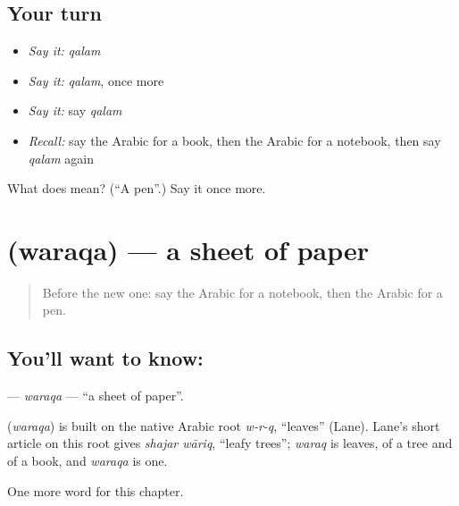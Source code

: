 \subsection*{Your turn}
\begin{itemize}
\raggedright
  \item \emph{Say it:} \emph{qalam}
  \item \emph{Say it:} \emph{qalam}, once more
  \item \emph{Say it:} say \emph{qalam}
  \item \emph{Recall:} say the Arabic for a book, then the Arabic for a notebook, then say \emph{qalam} again
\end{itemize}

\begin{tcolorbox}[breakable,colback=teal!4,colframe=teal!35!black,title={Before you move on}]
What does  mean? (\textquotedblleft{}A pen\textquotedblright{}.) Say it once more.
\end{tcolorbox}
\section[\texorpdfstring{\ar{ورقة} (waraqa)}{ورقة (waraqa)}]{ (waraqa) — a sheet of paper}

\label{lesson:AR-C73-waraqa}



\begin{quote}
Before the new one: say the Arabic for a notebook, then the Arabic for a pen.
\end{quote}

\subsection*{You'll want to know: }
\textbf{} — \emph{waraqa} — \textquotedblleft{}a sheet of paper\textquotedblright{}.

\begin{cousinweb}
\textbf{} (\emph{waraqa}) is built on the native Arabic root \emph{w-r-q}, \textquotedblleft{}leaves\textquotedblright{} (Lane). Lane's short article on this root gives \emph{shajar wāriq}, \textquotedblleft{}leafy trees\textquotedblright{}; \emph{waraq} is leaves, of a tree and of a book, and \emph{waraqa} is one.
\end{cousinweb}

\begin{grammarlens}[title={What you've built}]
One more word for this chapter.
\end{grammarlens}

